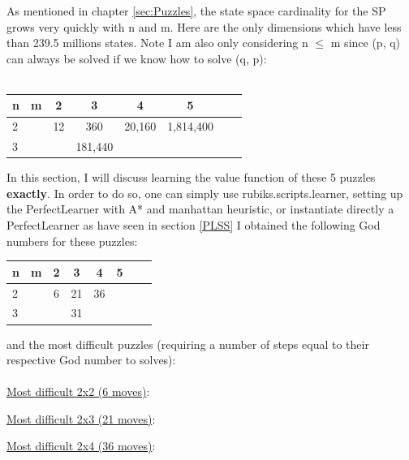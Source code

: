 As mentioned in chapter \ref{sec:Puzzles}, the state space cardinality for the SP grows very quickly with n and m. Here are the only dimensions which have less than 239.5 millions states. Note I am also only considering n $\leq$ m since (p, q) can always be solved if we know how to solve (q, p):
\\
\\
\begin{center}
\begin{tabular}{l*{6}{c}r}
n              & m & 2 & 3 & 4 & 5\\
\hline
2              &   & 12 & 360 & 20,160 & 1,814,400 \\
3              &   &   & 181,440 &  &    \\
\end{tabular}
\end{center}
In this section, I will discuss learning the value function of these 5 puzzles \textbf{exactly}.
In order to do so, one can simply use rubiks.scripts.learner, setting up the PerfectLearner with A* and manhattan heuristic, or instantiate directly a PerfectLearner as have seen in section \ref{PLSS}
I obtained the following God numbers for these puzzles:
\begin{center}
\begin{tabular}{l*{6}{c}r}
n              & m & 2 & 3 & 4 & 5\\
\hline
2              &   & 6 & 21 & 36 &  \\
3              &   &   & 31 &  &    \\
\end{tabular}
\end{center}
and the most difficult puzzles (requiring a number of steps equal to their respective God number to solves):
\\
\\
\underline{Most difficult 2x2 (6 moves)}:
\begin{center}
\begin{three}
\end{three}
\end{center}
\underline{Most difficult 2x3 (21 moves)}:
\begin{center}
\begin{five}
\end{five}
\end{center}
\underline{Most difficult 2x4 (36 moves)}:
\begin{center}
\begin{seven}
\end{seven}
\end{center}
